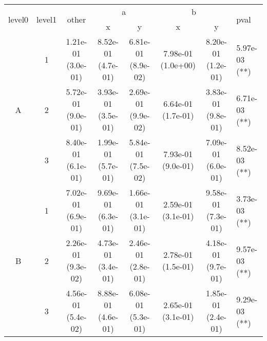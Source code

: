 \begin{tabular}{cccccccl}
\toprule
\multirow{2}{*}{level0} & \multirow{2}{*}{level1}& \multirow{2}{*}{other}&\multicolumn{2}{c}{a}&\multicolumn{2}{c}{b}& \multirow{2}{*}{pval}\tabularnewline
\cmidrule(lr){4-5}
\cmidrule(lr){6-7}
&&&x&y&x&y\tabularnewline
\midrule
\multirow{3}{*}{A}&1& 1.21e-01 (3.0e-01)& 8.52e-01 (4.7e-01)& 6.81e-01 (8.9e-02)& 7.98e-01 (1.0e+00)& 8.20e-01 (1.2e-01)& 5.97e-03 (**)\tabularnewline
&2& 5.72e-01 (9.0e-01)& 3.93e-01 (3.5e-01)& 2.69e-01 (9.9e-02)& 6.64e-01 (1.7e-01)& 3.83e-01 (9.8e-01)& 6.71e-03 (**)\tabularnewline
&3& 8.40e-01 (6.1e-01)& 1.99e-01 (5.7e-01)& 5.84e-01 (7.5e-02)& 7.93e-01 (9.0e-01)& 7.09e-01 (6.0e-01)& 8.52e-03 (**)\tabularnewline
\midrule
\multirow{3}{*}{B}&1& 7.02e-01 (6.9e-01)& 9.69e-01 (6.3e-01)& 1.66e-01 (3.1e-01)& 2.59e-01 (3.1e-01)& 9.58e-01 (7.3e-01)& 3.73e-03 (**)\tabularnewline
&2& 2.26e-01 (9.3e-02)& 4.73e-01 (3.4e-01)& 2.46e-01 (2.8e-01)& 2.78e-01 (1.5e-01)& 4.18e-01 (9.7e-01)& 9.57e-03 (**)\tabularnewline
&3& 4.56e-01 (5.4e-02)& 8.88e-01 (4.6e-01)& 6.08e-01 (5.3e-01)& 2.65e-01 (3.1e-01)& 1.85e-01 (2.4e-01)& 9.29e-03 (**)\tabularnewline
\bottomrule
\end{tabular}
